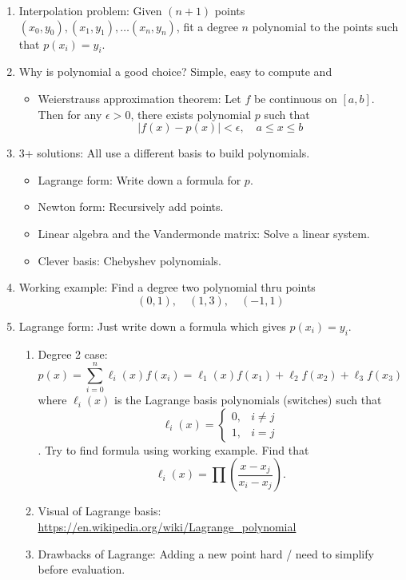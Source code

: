 \documentclass{article}
\theoremstyle{remark}
\begin{document}
\begin{enumerate}

\item Interpolation problem: Given $(n+1)$ points $(x_0,y_0), (x_1, y_1), \dots (x_n, y_n)$, fit a degree $n$ polynomial to the points such that $p(x_i)=y_i$. 

\item Why is polynomial a good choice? Simple, easy to compute and
\begin{itemize}
\item Weierstrauss approximation theorem: Let $f$ be continuous on $[a,b]$. Then for any $\epsilon > 0$, there exists polynomial $p$ such that
\[
|f(x)-p(x)| < \epsilon, \quad a \leq x \leq b
\]
\end{itemize}

\item 3+ solutions: All use a different basis to build polynomials.
\begin{itemize}
\item Lagrange form: Write down a formula for $p$.
\item Newton form: Recursively add points.
\item Linear algebra and the Vandermonde matrix: Solve a linear system.
\item Clever basis: Chebyshev polynomials.
\end{itemize} 


\item Working example: Find a degree two polynomial thru points
\[
(0,1), \quad (1,3), \quad (-1,1)
\]

\item Lagrange form: Just write down a formula which gives $p(x_i)=y_i$. 
\begin{enumerate}
\item Degree 2 case:
\[
p(x) = \sum_{i=0}^n \ell_i(x) f(x_i) = \ell_1(x) f(x_1) + \ell_2 f(x_2) + \ell_3 f(x_3)
\]
where $\ell_i(x)$ is the Lagrange basis polynomials (switches) such that 
\[
\ell_i(x) = 
\begin{cases}
0, & i \neq j \\
1, & i = j 
\end{cases}
\]. Try to find formula using working example. Find that
\[
\ell_i(x) = \prod \left(\frac{x-x_j}{x_i-x_j} \right).
\]
\item Visual of Lagrange basis: \url{https://en.wikipedia.org/wiki/Lagrange_polynomial}
\item Drawbacks of Lagrange: Adding a new point hard / need to simplify before evaluation.
\end{enumerate}



\end{enumerate}
\end{document}
